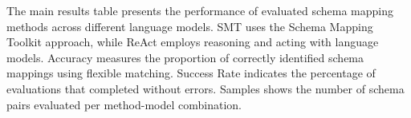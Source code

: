 
\begin{table}[htbp]
\centering
\caption{Schema Mapping Performance Comparison Across Methods and Models}
\label{tab:main_results}
\end{table}

The main results table presents the performance of evaluated schema mapping methods across different language models. SMT uses the Schema Mapping Toolkit approach, while ReAct employs reasoning and acting with language models. Accuracy measures the proportion of correctly identified schema mappings using flexible matching. Success Rate indicates the percentage of evaluations that completed without errors. Samples shows the number of schema pairs evaluated per method-model combination.

